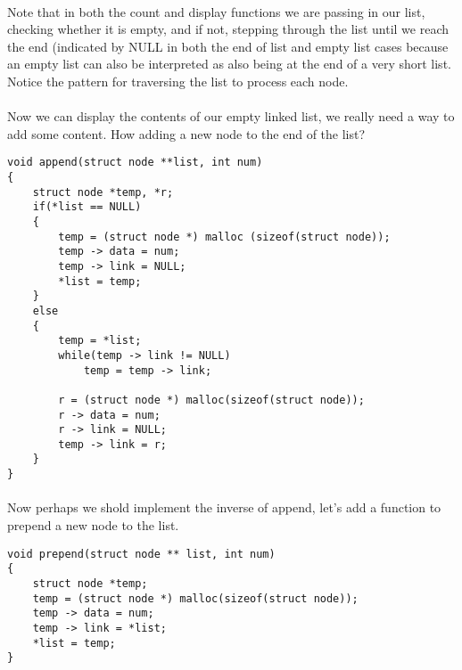 \documentclass[10pt, a4paper, twosize]{article}
\begin{document}
\paragraph{} Note that in both the count and display functions we are passing in our list, checking whether it is empty, and if not, stepping through the list until we reach the end (indicated by NULL in both the end of list and empty list cases because an empty list can also be interpreted as also being at the end of a very short list. Notice the pattern for traversing the list to process each node.

\paragraph{} Now we can display the contents of our empty linked list, we really need a way to add some content. How adding a new node to the end of the list?
\begin{lstlisting}
void append(struct node **list, int num)
{
    struct node *temp, *r;
    if(*list == NULL)
    {
        temp = (struct node *) malloc (sizeof(struct node));
        temp -> data = num;
        temp -> link = NULL;
        *list = temp;
    }
    else
    {
        temp = *list;
        while(temp -> link != NULL)
            temp = temp -> link;

        r = (struct node *) malloc(sizeof(struct node));
        r -> data = num;
        r -> link = NULL;
        temp -> link = r;
    }
}
\end{lstlisting}
\paragraph{} 

\paragraph{} Now perhaps we shold implement the inverse of append, let's add a function to prepend a new node to the list.
\begin{lstlisting}
void prepend(struct node ** list, int num)
{
    struct node *temp;
    temp = (struct node *) malloc(sizeof(struct node));
    temp -> data = num;
    temp -> link = *list;
    *list = temp;
}
\end{lstlisting}
\paragraph{} 
\end{document}
